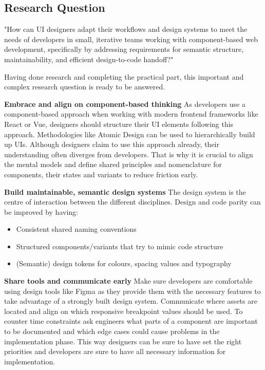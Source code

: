 \newpage
\subsection{Research Question}
"How can UI designers adapt their workflows and design systems to meet the needs of developers in
small, iterative teams working with component-based web development, specifically by addressing
requirements for semantic structure, maintainability, and efficient design-to-code handoff?"

Having done research and completing the practical part, this important and complex research question
is ready to be answered.

\textbf{Embrace and align on component-based thinking}
As developers use a component-based approach when working with modern frontend frameworks like React
or Vue, designers should structure their UI elements following this approach. Methodologies like
Atomic Design can be used to hierarchically build up UIs. Although designers claim to use this
approach already, their understanding often diverges from developers. That is why it is crucial to
align the mental models and define shared principles and nomenclature for components, their states
and variants to reduce friction early.

\textbf{Build maintainable, semantic design systems}
The design system is the centre of interaction between the different disciplines. Design and code
parity can be improved by having:
\begin{itemize}
    \item Consistent shared naming conventions
    \item Structured components/variants that try to mimic code structure
    \item (Semantic) design tokens for colours, spacing values and typography
\end{itemize}

\textbf{Share tools and communicate early}
Make sure developers are comfortable using design tools like Figma as they provide them with the
necessary features to take advantage of a strongly built design system. Communicate where assets are
located and align on which responsive breakpoint values should be used. To counter time constraints
ask engineers what parts of a component are important to be documented and which edge cases could
cause problems in the implementation phase. This way designers can be sure to have set the right
priorities and developers are sure to have all necessary information for implementation.

